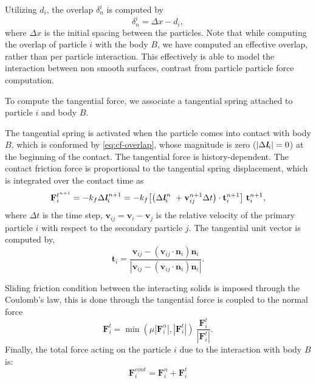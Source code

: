 \documentclass[preprint,12pt]{elsarticle}
\newcommand{\todoin}{\todo[inline]}
\newcommand{\ten}[1]{\ensuremath{\mathbf{#1}}}
\begin{document}
Utilizing $d_i$, the overlap $\delta_{n}^{i}$ is computed by
\begin{equation}
  \label{eq:cf-overlap}
  \delta_{n}^{i} = \Delta x - d_i,
\end{equation}
where $\Delta x$ is the initial spacing between the particles. Note that while
computing the overlap of particle $i$ with the body $B$, we have computed an
effective overlap, rather than per particle interaction. This effectively is
able to model the interaction between non smooth surfaces, contrast from
particle particle force computation.

\todoin{Write about damping}

To compute the tangential force, we associate a tangential spring attached to
particle $i$ and body $B$.

The tangential spring is activated when the particle comes into contact with
body $B$, which is conformed by \cref{eq:cf-overlap}, whose magnitude is zero
($|\Delta \textit{\textbf{l}}_i|=0$) at the beginning of the contact. The
tangential force is history-dependent. The contact friction force is
proportional to the tangential spring displacement, which is integrated over
the contact time as
\begin{equation}
  \label{eq:tangential-force}
  \ten{F}_{i}^{t^{n+1}} =
  -k_f \Delta \textit{\textbf{l}}_i^{\,n + 1} =
  -k_f \big[\big(\Delta {\textit{\textbf{l}}}_i^{\,n} \
  + \ten{v}_{ij}^{n + 1} \Delta t\big) \cdot \ten{t}_i^{n + 1} \big] \
  \ten{t}_i^{n + 1},
\end{equation}
where $\Delta t$ is the time step, $\ten{v}_{ij} = \ten{v}_{i} - \ten{v}_j$ is
the relative velocity of the primary particle $i$ with respect to the
secondary particle $j$. The tangential unit vector is computed by,
\begin{equation}
  \label{eq:tangential-vect}
  \ten{t}_i = \frac{\ten{v}_{ij} - (\ten{v}_{ij} \cdot \ten{n}_i) \ten{n}_i}{|\ten{v}_{ij} - (\ten{v}_{ij} \cdot \ten{n}_i) \ten{n}_i|}.
\end{equation}

Sliding friction condition between the interacting solids is imposed through
the Coulomb's law, this is done through the tangential force is coupled to the
normal force
\begin{equation}
  \label{eq:Coulomb-law}
  \ten{F}_{i}^{t} = \min(\mu |\ten{F}_{i}^{n}|, |\ten{F}_{i}^{t}|) \
  \frac{\ten{F}_{i}^{t}}{|\ten{F}_{i}^{t}|}.
\end{equation}
Finally, the total force acting on the particle $i$ due to the
interaction with body $B$ is:
\begin{equation}
  \label{eq:contact-force}
  \ten{F}_{i}^{cont} = \ten{F}_{i}^{n} + \ten{F}_{i}^{t}
\end{equation}
\end{document}

